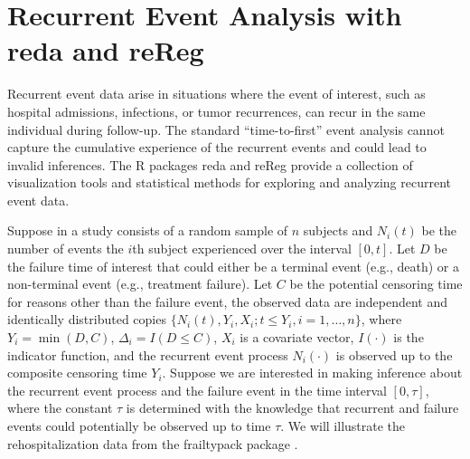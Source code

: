 \documentclass{report}
\let\proglang=\textsf
\newcommand{\pkg}[1]{{\fontseries{b}\selectfont #1}}
\begin{document}
\section*{Recurrent Event Analysis with \pkg{reda} and \pkg{reReg}}

Recurrent event data arise in situations where the event of interest,
such as hospital admissions, infections, or tumor recurrences,
can recur in the same individual during follow-up.
The standard ``time-to-first'' event analysis cannot capture the cumulative experience of
the recurrent events and could lead to invalid inferences.
The \proglang{R} packages \pkg{reda} \citep{reda-package} and \pkg{reReg} \citep{reReg-package}
provide a collection of visualization tools and statistical methods for exploring and analyzing 
recurrent event data.


Suppose in a study consists of a random sample of $n$ subjects and 
$N_i(t)$ be the number of events the $i$th subject experienced over the interval $[0, t]$. 
Let $D$ be the failure time of interest that could either be a terminal event (e.g., death)
or a non-terminal event (e.g., treatment failure).
Let $C$ be the potential censoring time for reasons other than the failure event,
the observed data are independent and identically distributed copies
$\{N_i(t), Y_i, X_i; t\le Y_i, i = 1, \ldots, n\}$,
where $Y_i = \min(D, C)$, $\Delta_i = I(D\le C)$,
$X_i$ is a covariate vector, $I(\cdot)$ is the indicator function,
and the recurrent event process $N_i(\cdot)$ is observed up to the composite censoring time $Y_i$.
Suppose we are interested in making inference about the recurrent event process and the failure
event in the time interval $[0, \tau]$, where the constant $\tau$ is determined with the knowledge
that recurrent and failure events could potentially be observed up to time $\tau$.
We will illustrate the rehospitalization data \citep{gonzalez2005sex} from the \pkg{frailtypack} 
package \citep{fp}.









\renewcommand{\bibsection}{\section*{Reference}}
\setlength{\bibhang}{0pt}
\setlength{\bibsep}{0.4em}


\end{document}
